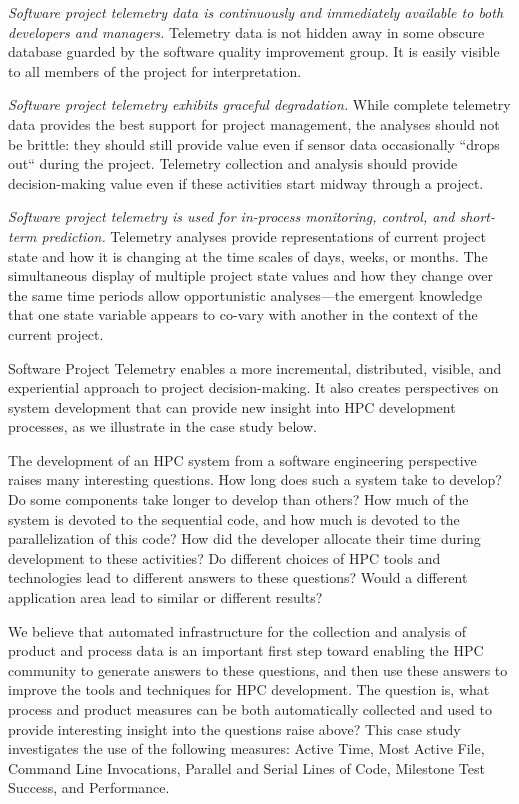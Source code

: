 \documentclass[10pt,twocolumn]{article}
\begin{document}
{\em Software project telemetry data is continuously and immediately
available to both developers and managers.}  Telemetry data is not hidden
away in some obscure database guarded by the software quality improvement
group.  It is easily visible to all members of the project for
interpretation.

{\em Software project telemetry exhibits graceful degradation.}  While
complete telemetry data provides the best support for project management,
the analyses should not be brittle: they should still provide value even if
sensor data occasionally ``drops out`` during the project. Telemetry
collection and analysis should provide decision-making value even if these
activities start midway through a project.
         
{\em Software project telemetry is used for in-process monitoring, control,
and short-term prediction.} Telemetry analyses provide representations of
current project state and how it is changing at the time scales of days,
weeks, or months.  The simultaneous display of multiple project state
values and how they change over the same time periods allow opportunistic
analyses---the emergent knowledge that one state variable appears to
co-vary with another in the context of the current project.

Software Project Telemetry enables a more incremental, distributed,
visible, and experiential approach to project decision-making. It also
creates perspectives on system development that can provide new insight
into HPC development processes, as we illustrate in the case study below.


\label{sec:metrics}

The development of an HPC system from a software engineering perspective
raises many interesting questions.  How long does such a system take to
develop?  Do some components take longer to develop than others?  How much
of the system is devoted to the sequential code, and how much is devoted
to the parallelization of this code?  How did the developer allocate their
time during development to these activities?  Do different choices of HPC
tools and technologies lead to different answers to these questions?  Would 
a different application area lead to similar or different results? 

We believe that automated infrastructure for the collection and
analysis of product and process data is an important first step toward
enabling the HPC community to generate answers to these questions,
and then use these answers to improve the tools and techniques for
HPC development.  The question is, what process and product measures
can be both automatically collected and used to provide interesting
insight into the questions raise above?  This case study investigates
the use of the following measures: Active Time, Most Active File,
Command Line Invocations, Parallel and Serial Lines of Code, Milestone
Test Success, and Performance.
\end{document}
